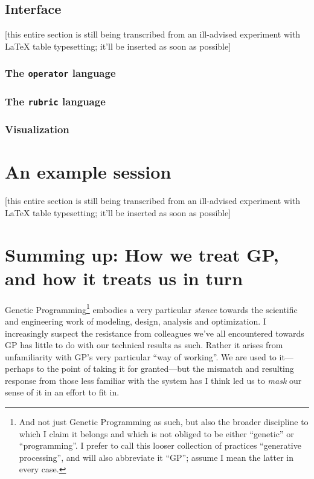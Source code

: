 \subsection{Interface}\hypertarget{interface}{}\label{interface}

[this entire section is still being transcribed from an ill-advised experiment with LaTeX table typesetting; it'll be inserted as soon as possible]

\subsubsection{The {\tt operator} language}\hypertarget{the-operator-language}{}\label{the-operator-language}

\subsubsection{The {\tt rubric} language}\hypertarget{the-rubric-language}{}\label{the-rubric-language}

\subsubsection{Visualization}\hypertarget{visualization}{}\label{visualization}

\section{An example session}\hypertarget{an-example-session}{}\label{an-example-session}

[this entire section is still being transcribed from an ill-advised experiment with LaTeX table typesetting; it'll be inserted as soon as possible]

\section{Summing up: How we treat GP, and how it treats us in turn}\hypertarget{summing-up-how-we-treat-gp-and-how-it-treats-us-in-turn}{}\label{summing-up-how-we-treat-gp-and-how-it-treats-us-in-turn}

Genetic Programming\footnote{And not just Genetic Programming as such, but also the broader discipline to which I claim it belongs and which is not obliged to be either ``genetic'' or ``programming''. I prefer to call this looser collection of practices ``generative processing'', and will also abbreviate it ``GP''; assume I mean the latter in every case.} embodies a very particular \emph{stance} towards the scientific and engineering work of modeling, design, analysis and optimization. I increasingly suspect the resistance from colleagues we've all encountered towards GP has little to do with our technical results as such. Rather it arises from unfamiliarity with GP's very particular ``way of working''. We are used to it---perhaps to the point of taking it for granted---but the mismatch and resulting response from those less familiar with the system has I think led us to \emph{mask} our sense of it in an effort to fit in.

